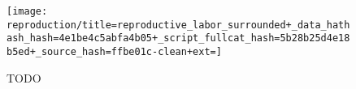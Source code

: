 \begin{figure}[!htbp]
\begin{center}

\texttt{[image: reproduction/title=reproductive\_labor\_surrounded+\_data\_hathash\_hash=4e1be4c5abfa4b05+\_script\_fullcat\_hash=5b28b25d4e18b5ed+\_source\_hash=ffbe01c-clean+ext=]}

\caption{
TODO
}
\label{fig:reproduction_surrounted}
\end{center}
\end{figure}
